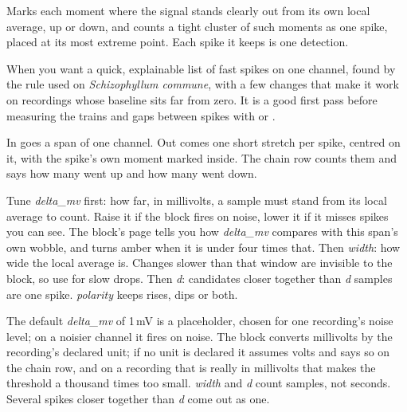 Marks each moment where the signal stands clearly out from its own local average, up or
down, and counts a tight cluster of such moments as one spike, placed at its most extreme
point. Each spike it keeps is one detection.

When you want a quick, explainable list of fast spikes on one channel, found by the rule
\citet{adamatzky2023multiscalar} used on \emph{Schizophyllum commune}, with a few changes
that make it work on recordings whose baseline sits far from zero. It is a good first pass
before measuring the trains and gaps between spikes with  or
.

In goes a span of one channel. Out comes one short stretch per spike, centred on it, with
the spike's own moment marked inside. The chain row counts them and says how many went up
and how many went down.

Tune \emph{delta\_mv} first: how far, in millivolts, a sample must stand from its local
average to count. Raise it if the block fires on noise, lower it if it misses spikes you can
see. The block's page tells you how \emph{delta\_mv} compares with this span's own
wobble, and turns amber when it is under four times that. Then \emph{width}: how wide the
local average is. Changes slower than that window are invisible to the block, so use
 for slow drops. Then \emph{d}: candidates closer
together than \emph{d} samples are one spike. \emph{polarity} keeps rises, dips or both.

The default \emph{delta\_mv} of 1\,mV is a placeholder, chosen for one recording's noise
level; on a noisier channel it fires on noise. The block converts millivolts by the
recording's declared unit; if no unit is declared it assumes volts and says so on the chain
row, and on a recording that is really in millivolts that makes the threshold a thousand
times too small. \emph{width} and \emph{d} count samples, not seconds. Several spikes closer
together than \emph{d} come out as one.
